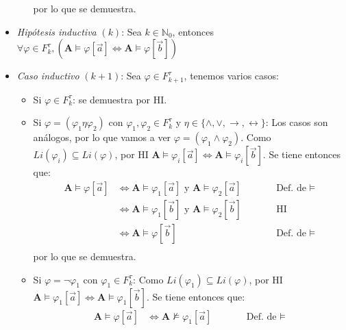\documentclass{article}
\begin{document}
\begin{itemize}
\begin{itemize}
                por lo que se demuestra.
        \end{itemize}
  \item \textit{Hipótesis inductiva} $(k)$: Sea $k\in\mathbb{N}_0$, entonces $\forall\varphi\in F^\tau_k,(\mathbf{A}\vDash\varphi[\vec{a}]\iff\mathbf{A}\vDash\varphi[\vec{b}])$
  \item \textit{Caso inductivo} $(k+1)$: Sea $\varphi\in F^\tau_{k+1}$, tenemos varios casos:
        \begin{itemize}
          \item Si $\varphi\in F^\tau_k$: se demuestra por HI.
          \item Si $\varphi=(\varphi_1\eta\varphi_2)$ con $\varphi_1,\varphi_2\in F^\tau_k$ y $\eta\in\{\land,\lor,\to,\leftrightarrow\}$: Los casos son análogos, por lo que vamos a ver $\varphi=(\varphi_1\land\varphi_2)$. Como $Li(\varphi_i)\subseteq Li(\varphi)$, por HI $\mathbf{A}\vDash\varphi_i[\vec{a}]\iff\mathbf{A}\vDash\varphi_i[\vec{b}]$. Se tiene entonces que:
                \begin{equation*}
                  \begin{alignedat}{2}
                    \mathbf{A}\vDash\varphi[\vec{a}] & \iff \mathbf{A}\vDash\varphi_1[\vec{a}]\text{ y }\mathbf{A}\vDash\varphi_2[\vec{a}] &  & \qquad\text{Def. de }\vDash \\
                                                     & \iff \mathbf{A}\vDash\varphi_1[\vec{b}]\text{ y }\mathbf{A}\vDash\varphi_2[\vec{b}] &  & \qquad\text{HI}             \\
                                                     & \iff \mathbf{A}\vDash\varphi[\vec{b}]                                               &  & \qquad\text{Def. de }\vDash \\
                  \end{alignedat}
                \end{equation*}
                por lo que se demuestra.
          \item Si $\varphi=\neg\varphi_1$ con $\varphi_1\in F^\tau_k$: Como $Li(\varphi_1)\subseteq Li(\varphi)$, por HI $\mathbf{A}\vDash\varphi_1[\vec{a}]\iff\mathbf{A}\vDash\varphi_1[\vec{b}]$. Se tiene entonces que:
                \begin{equation*}
                  \begin{alignedat}{2}
                    \mathbf{A}\vDash\varphi[\vec{a}] & \iff \mathbf{A}\nvDash\varphi_1[\vec{a}] &  & \qquad\text{Def. de }\vDash \\

\end{alignedat}
\end{equation*}
\end{itemize}
\end{itemize}
\end{document}
